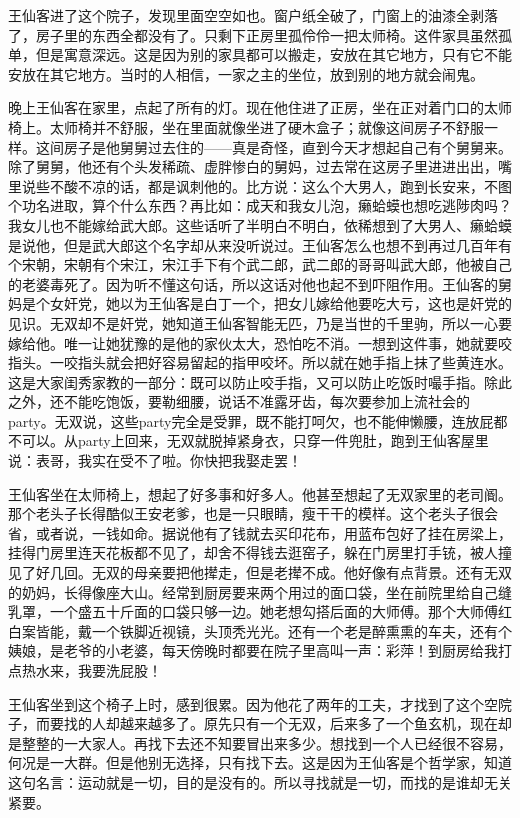 王仙客进了这个院子，发现里面空空如也。窗户纸全破了，门窗上的油漆全剥落了，房子里的东西全都没有了。只剩下正房里孤伶伶一把太师椅。这件家具虽然孤单，但是寓意深远。这是因为别的家具都可以搬走，安放在其它地方，只有它不能安放在其它地方。当时的人相信，一家之主的坐位，放到别的地方就会闹鬼。 

晚上王仙客在家里，点起了所有的灯。现在他住进了正房，坐在正对着门口的太师椅上。太师椅并不舒服，坐在里面就像坐进了硬木盒子；就像这间房子不舒服一样。这间房子是他舅舅过去住的——真是奇怪，直到今天才想起自己有个舅舅来。除了舅舅，他还有个头发稀疏、虚胖惨白的舅妈，过去常在这房子里进进出出，嘴里说些不酸不凉的话，都是讽刺他的。比方说：这么个大男人，跑到长安来，不图个功名进取，算个什么东西？再比如：成天和我女儿泡，癞蛤蟆也想吃逃陟肉吗？我女儿也不能嫁给武大郎。这些话听了半明白不明白，依稀想到了大男人、癞蛤蟆是说他，但是武大郎这个名字却从来没听说过。王仙客怎么也想不到再过几百年有个宋朝，宋朝有个宋江，宋江手下有个武二郎，武二郎的哥哥叫武大郎，他被自己的老婆毒死了。因为听不懂这句话，所以这话对他也起不到吓阻作用。王仙客的舅妈是个女奸党，她以为王仙客是白丁一个，把女儿嫁给他要吃大亏，这也是奸党的见识。无双却不是奸党，她知道王仙客智能无匹，乃是当世的千里驹，所以一心要嫁给他。唯一让她犹豫的是他的家伙太大，恐怕吃不消。一想到这件事，她就要咬指头。一咬指头就会把好容易留起的指甲咬坏。所以就在她手指上抹了些黄连水。这是大家闺秀家教的一部分：既可以防止咬手指，又可以防止吃饭时嘬手指。除此之外，还不能吃饱饭，要勒细腰，说话不准露牙齿，每次要参加上流社会的party。无双说，这些party完全是受罪，既不能打呵欠，也不能伸懒腰，连放屁都不可以。从party上回来，无双就脱掉紧身衣，只穿一件兜肚，跑到王仙客屋里说：表哥，我实在受不了啦。你快把我娶走罢！ 

王仙客坐在太师椅上，想起了好多事和好多人。他甚至想起了无双家里的老司阍。那个老头子长得酷似王安老爹，也是一只眼睛，瘦干干的模样。这个老头子很会省，或者说，一钱如命。据说他有了钱就去买印花布，用蓝布包好了挂在房梁上，挂得门房里连天花板都不见了，却舍不得钱去逛窑子，躲在门房里打手铳，被人撞见了好几回。无双的母亲要把他撵走，但是老撵不成。他好像有点背景。还有无双的奶妈，长得像座大山。经常到厨房要来两个用过的面口袋，坐在前院里给自己缝乳罩，一个盛五十斤面的口袋只够一边。她老想勾搭后面的大师傅。那个大师傅红白案皆能，戴一个铁脚近视镜，头顶秃光光。还有一个老是醉熏熏的车夫，还有个姨娘，是老爷的小老婆，每天傍晚时都要在院子里高叫一声：彩萍！到厨房给我打点热水来，我要洗屁股！ 

王仙客坐到这个椅子上时，感到很累。因为他花了两年的工夫，才找到了这个空院子，而要找的人却越来越多了。原先只有一个无双，后来多了一个鱼玄机，现在却是整整的一大家人。再找下去还不知要冒出来多少。想找到一个人已经很不容易，何况是一大群。但是他别无选择，只有找下去。这是因为王仙客是个哲学家，知道这句名言：运动就是一切，目的是没有的。所以寻找就是一切，而找的是谁却无关紧要。 

